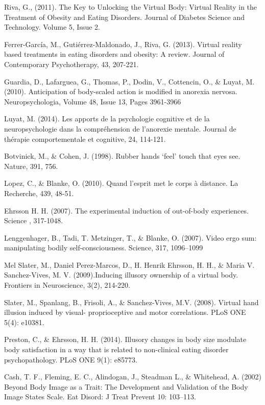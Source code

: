 \begin{thebibliography}{10}

  	Riva, G., (2011). The Key to Unlocking the Virtual Body: Virtual Reality in the Treatment of Obesity and Eating Disorders. Journal of Diabetes Science and Technology. Volume 5, Issue 2.
  			
	Ferrer-García, M., Gutiérrez-Maldonado, J., Riva, G. (2013). Virtual reality based treatments in eating disorders and obesity: A review. Journal of Contemporary Psychotherapy, 43, 207-221.
	
 	Guardia, D., Lafarguea, G., Thomas, P., Dodin, V., Cottencin, O., \& Luyat, M. (2010). Anticipation of body-scaled action is modified in anorexia nervosa. Neuropsychologia, Volume 48, Issue 13, Pages 3961-3966
 		
 	Luyat, M. (2014). Les apports de la psychologie cognitive et de la neuropsychologie dans la compréhension de l'anorexie mentale. Journal de thérapie comportementale et cognitive, 24, 114-121.
 	
 	Botvinick, M., \& Cohen, J. (1998). Rubber hands ‘feel’ touch that eyes see. Nature, 391, 756.
 	
  	
 	Lopez, C., \& Blanke, O. (2010). Quand l'esprit met le corps à distance. La Recherche, 439, 48-51.
 	
 	Ehrsson H. H. (2007). The experimental induction of out-of-body experiences. Science , 317-1048.
 
 	Lenggenhager, B., Tadi, T. Metzinger, T., \& Blanke, O. (2007). Video ergo sum: manipulating bodily self-consciousness. Science, 317, 1096–1099
 	
 
  	Mel Slater, M., Daniel Perez-Marcos, D., H. Henrik Ehrsson, H. H., \& Maria V. Sanchez-Vives, M. V. (2009).Inducing illusory ownership of a virtual body. Frontiers in Neuroscience, 3(2), 214-220.
  	
  	Slater, M., Spanlang, B., Frisoli, A., \& Sanchez-Vives, M.V. (2008). Virtual hand illusion induced by visual- proprioceptive and motor correlations. PLoS ONE 5(4): e10381.
   	
  	Preston, C., \& Ehrsson, H. H. (2014). Illusory changes in body size modulate body satisfaction in a way that is related to non-clinical eating disorder psychopathology. PLoS ONE 9(1): e85773.
  	
 	Cash, T. F., Fleming, E. C., Alindogan, J., Steadman L., \& Whitehead, A. (2002) Beyond Body Image as a Trait: The Development and Validation of the Body Image States Scale. Eat Disord: J Treat Prevent 10: 103–113.
 

\end{thebibliography}
